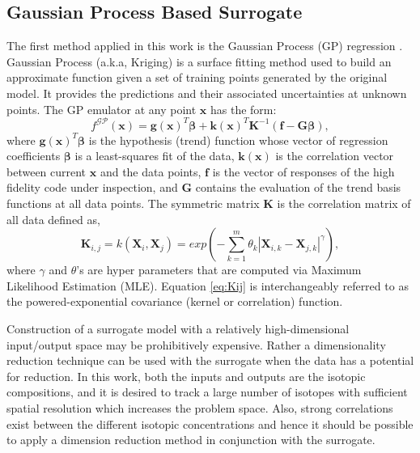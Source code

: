 \documentclass{anstrans}
\begin{document}
\subsection{Gaussian Process Based Surrogate}
The first method applied in this work is the Gaussian Process (GP) regression \cite{eldred2006dakota}. Gaussian Process (a.k.a, Kriging) is a surface fitting  method used to build an approximate function given a set of training points generated by the original model. It provides the predictions and their associated uncertainties at unknown points.
The GP emulator at any point $\mathbf{x}$ has the form:
\begin{equation}
f^{\mathcal{GP}}(\mathbf{x}) = \mathbf{g}(\mathbf{x})^T\boldsymbol{\beta} + \mathbf{k}(\mathbf{x})^T\mathbf{K}^{-1}(\mathbf{f}-\mathbf{G}\boldsymbol{\beta}),
\end{equation}
where $\mathbf{g}(\mathbf{x})^T\boldsymbol{\beta}$ is the hypothesis (trend) function whose vector of regression coefficients $\boldsymbol{\beta}$ is a least-squares fit of the data, $\mathbf{k}(\mathbf{x})$ is the correlation vector between current $\mathbf{x}$ and the data points, $\mathbf{f}$ is the vector of responses of the high fidelity code under inspection, and $\mathbf{G}$ contains the evaluation of the trend basis functions at all data points. The symmetric matrix $\mathbf{K}$ is the correlation matrix of all data defined as, 
\begin{equation}
\label{eq:Kij}
\mathbf{K}_{i,j}=k(\mathbf{X}_i,\mathbf{X}_j)=exp(-\sum_{k=1}^{m}\theta_k|\mathbf{X}_{i,k}-\mathbf{X}_{j,k}|^\gamma),
\end{equation}
where $\gamma$ and $\theta$'s are hyper parameters that are computed via Maximum Likelihood Estimation (MLE). Equation \ref{eq:Kij} is interchangeably referred to as the powered-exponential covariance (kernel or correlation) function. 

Construction of a surrogate model with a relatively high-dimensional input/output space may be prohibitively expensive. Rather a dimensionality reduction technique can be used with the surrogate when the data has a potential for reduction. In this work, both the inputs and outputs are the isotopic compositions, and it is desired to track a large number of isotopes with sufficient spatial resolution which increases the problem space. Also, strong correlations exist between the different isotopic concentrations and hence it should be possible to apply a dimension reduction method in conjunction with the surrogate.
\end{document}
